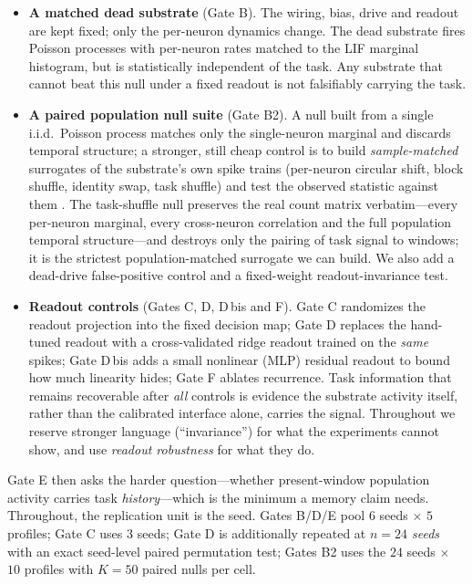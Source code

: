 \documentclass[10pt,a4paper]{article}
\begin{document}
\begin{itemize}[nosep]
\item \textbf{A matched dead substrate} (Gate B). The wiring, bias,
drive and readout are kept fixed; only the per-neuron dynamics change.
The dead substrate fires Poisson processes with per-neuron rates
matched to the LIF marginal histogram, but is statistically independent
of the task. Any substrate that cannot beat this null under a fixed
readout is not falsifiably carrying the task.
\item \textbf{A paired population null suite} (Gate B2). A null built
from a single i.i.d.\ Poisson process matches only the single-neuron
marginal and discards temporal structure; a stronger, still cheap
control is to build \emph{sample-matched} surrogates of the substrate's
own spike trains (per-neuron circular shift, block shuffle, identity
swap, task shuffle) and test the observed statistic against them
\cite{theiler1992}. The task-shuffle null preserves the real count matrix
verbatim---every per-neuron marginal, every cross-neuron correlation and
the full population temporal structure---and destroys only the pairing
of task signal to windows; it is the strictest population-matched
surrogate we can build. We also add a dead-drive
false-positive control and a fixed-weight readout-invariance test.
\item \textbf{Readout controls} (Gates C, D, D\,bis and F). Gate C
randomizes the readout projection into the fixed decision map; Gate D
replaces the hand-tuned readout with a cross-validated ridge readout
trained on the \emph{same} spikes; Gate D\,bis adds a small nonlinear
(MLP) residual readout to bound how much linearity hides; Gate F
ablates recurrence. Task information that remains recoverable after
\emph{all} controls is evidence the substrate activity itself, rather
than the calibrated interface alone, carries the signal. Throughout we
reserve stronger language (``invariance'') for what the experiments
cannot show, and use \emph{readout robustness} for what they do.
\end{itemize}

Gate E then asks the harder question---whether present-window population
activity carries task \emph{history}---which is the minimum a memory
claim needs. Throughout, the replication unit is the seed. Gates B/D/E
pool $6$ seeds $\times$ $5$ profiles; Gate C uses $3$ seeds; Gate D is
additionally repeated at \emph{$n=24$ seeds} with an exact seed-level
paired permutation test; Gates B2 uses the $24$ seeds $\times$ $10$
profiles with $K=50$ paired nulls per cell.
\end{document}
